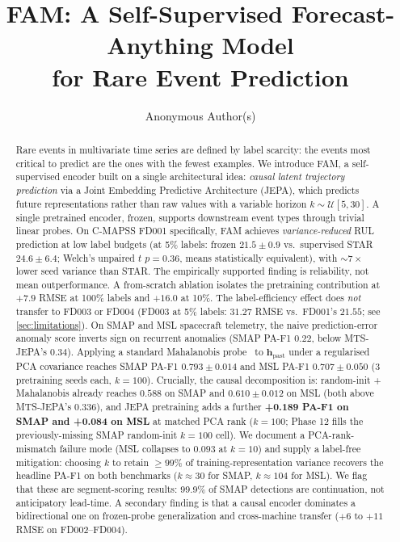 \documentclass{article}
\title{FAM: A Self-Supervised Forecast-Anything Model\\for Rare Event Prediction}
\author{Anonymous Author(s)}
\newcommand{\h}{\mathbf{h}}
\begin{document}
\maketitle

\begin{abstract}
Rare events in multivariate time series are defined by label scarcity: the events most critical to predict are the ones with the fewest examples. We introduce FAM, a self-supervised encoder built on a single architectural idea: \emph{causal latent trajectory prediction} via a Joint Embedding Predictive Architecture (JEPA), which predicts future representations rather than raw values with a variable horizon $k \sim \mathcal{U}[5,30]$. A single pretrained encoder, frozen, supports downstream event types through trivial linear probes. On C-MAPSS FD001 specifically, FAM achieves \emph{variance-reduced} RUL prediction at low label budgets (at 5\% labels: frozen $21.5 \pm 0.9$ vs.\ supervised STAR $24.6 \pm 6.4$; Welch's unpaired $t$ $p = 0.36$, means statistically equivalent), with $\sim 7\times$ lower seed variance than STAR. The empirically supported finding is reliability, not mean outperformance. A from-scratch ablation isolates the pretraining contribution at $+7.9$ RMSE at 100\% labels and $+16.0$ at 10\%. The label-efficiency effect does \emph{not} transfer to FD003 or FD004 (FD003 at 5\% labels: $31.27$ RMSE vs.\ FD001's $21.55$; see \cref{sec:limitations}). On SMAP and MSL spacecraft telemetry, the naive prediction-error anomaly score inverts sign on recurrent anomalies (SMAP PA-F1 $0.22$, below MTS-JEPA's $0.34$). Applying a standard Mahalanobis probe~\citep{lee2018mahalanobis,sehwag2021ssd,ren2021simple} to $\h_\text{past}$ under a regularised PCA covariance reaches SMAP PA-F1 $0.793 \pm 0.014$ and MSL PA-F1 $0.707 \pm 0.050$ (3 pretraining seeds each, $k{=}100$). Crucially, the causal decomposition is: random-init + Mahalanobis already reaches $0.588$ on SMAP and $0.610 \pm 0.012$ on MSL (both above MTS-JEPA's $0.336$), and JEPA pretraining adds a further \textbf{+0.189 PA-F1 on SMAP and +0.084 on MSL} at matched PCA rank ($k{=}100$; Phase 12 fills the previously-missing SMAP random-init $k{=}100$ cell). We document a PCA-rank-mismatch failure mode (MSL collapses to $0.093$ at $k=10$) and supply a label-free mitigation: choosing $k$ to retain $\geq 99\%$ of training-representation variance recovers the headline PA-F1 on both benchmarks ($k \approx 30$ for SMAP, $k \approx 104$ for MSL). We flag that these are segment-scoring results: 99.9\% of SMAP detections are continuation, not anticipatory lead-time. A secondary finding is that a causal encoder dominates a bidirectional one on frozen-probe generalization and cross-machine transfer ($+6$ to $+11$ RMSE on FD002--FD004).
\end{abstract}
\end{document}
